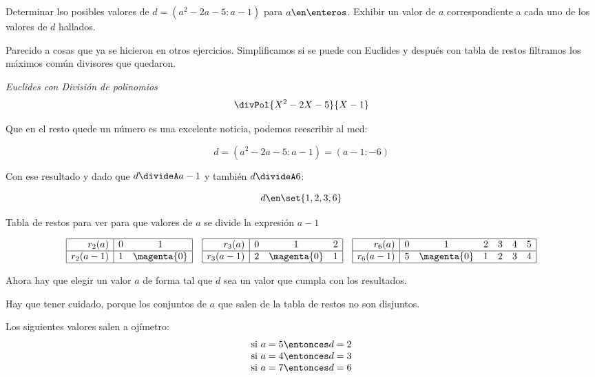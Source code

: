 \begin{enunciado}{\ejExtra}
	Determinar lso posibles valores de $d = (a^2 - 2a -5: a-1)$ para $a \en \enteros$. Exhibir un valor de $a$
	correspondiente a cada uno de los valores de $d$ hallados.
\end{enunciado}


Parecido a cosas que ya se hicieron en otros ejercicios. Simplificamos si se puede con Euclides y después con tabla de restos
filtramos los máximos común divisores que quedaron.\par \bigskip

\textit{Euclides con División de polinomios}
$$
	\divPol{X^2 - 2X -5}{X-1}
$$

Que en el resto quede un número es una excelente noticia, podemos reescribir al mcd:

$$
	d = (a^2 - 2a -5: a-1) = (a-1 : -6)
$$

Con ese resultado y dado que $d  \divideA a - 1$ y también $d\divideA 6$:

$$
	d \en \set{1, 2, 3, 6}
$$

Tabla de restos para ver para que valores de $a$ se divide la expresión $a-1$

$$
	\begin{array}{|r|cc|}
		\hline
		r_2(a)     & 0 & 1           \\ \hline
		r_2(a - 1) & 1 & \magenta{0} \\ \hline
	\end{array}
	\quad
	\begin{array}{|r|ccc|}
		\hline
		r_3(a)     & 0 & 1           & 2 \\ \hline
		r_3(a - 1) & 2 & \magenta{0} & 1 \\ \hline
	\end{array}
	\quad
	\begin{array}{|r|cccccc|}
		\hline
		r_6(a)     & 0 & 1           & 2 & 3 & 4 & 5 \\ \hline
		r_6(a - 1) & 5 & \magenta{0} & 1 & 2 & 3 & 4 \\ \hline
	\end{array}
$$\par

Ahora hay que elegir un valor $a$ de forma tal que $d$ sea un valor que cumpla con los resultados.\par

Hay que tener cuidado, porque los conjuntos de $a$ que salen de la tabla de restos no son disjuntos.

Los siguientes valores salen a ojímetro:
$$
	\begin{array}{c}
		\text{si } a = 5 \entonces d = 2 \\
		\text{si } a = 4 \entonces d = 3 \\
		\text{si } a = 7 \entonces d = 6
	\end{array}
$$

